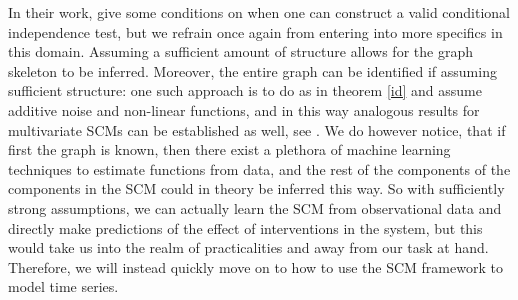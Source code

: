 \documentclass[11pt, a4paper]{memoir}
\theoremstyle{break}
\theoremstyle{break}
\theoremstyle{nonumberplain}
\begin{document}
In their work, \cite{CondIndTest} give some conditions on when one can construct a valid conditional independence test, but we refrain once again from entering into more specifics in this domain. Assuming a sufficient amount of structure allows for the graph skeleton to be inferred. Moreover, the entire graph can be identified if assuming sufficient structure: one such approach is to do as in theorem \ref{id} and assume additive noise and non-linear functions, and in this way analogous results for multivariate SCMs can be established as well, see \cite{ANM3}. We do however notice, that if first the graph is known, then there exist a plethora of machine learning techniques to estimate functions from data, and the rest of the components of the components in the SCM could in theory be inferred this way. So with sufficiently strong assumptions, we can actually learn the SCM from observational data and directly make predictions of the effect of interventions in the system, but this would take us into the realm of practicalities and away from our task at hand. Therefore, we will instead quickly move on to how to use the SCM framework to model time series. 
\end{document}
